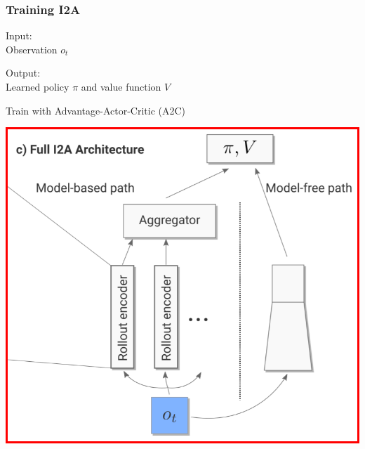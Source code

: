 \begin{frame}
    \frametitle{Training I2A}

\begin{multicols}{2}
	\begin{PraesentationAufzaehlung}
		\item Input:\\
		Observation $o_t$
		\item Output:\\
		Learned policy $\pi$ and value function $V$
		\item Train with Advantage-Actor-Critic (A2C)
	\end{PraesentationAufzaehlung}
    \vfill\columnbreak
	\begin{center}
    \includegraphics[width=\columnwidth]{./Images/i2a_a2c.png}%
	\end{center}
\end{multicols}
    
\end{frame}
\clearpage

